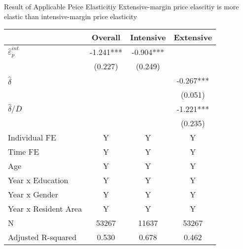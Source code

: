 \documentclass[
  ignorenonframetext,
  aspectratio=169,
]{beamer}
\begin{document}
\begin{frame}{Result of Applicable Peice Elasticitiy}
\protect\hypertarget{result-of-applicable-peice-elasticitiy}{}
Extensive-margin price elascitiy is more elastic than intensive-margin price elasticity

\begin{table}
\centering\begingroup\fontsize{8}{10}\selectfont

\begin{tabular}{lccc}
\toprule
 & Overall & Intensive & Extensive\\
\midrule
$\hat{\varepsilon}_p^{int}$ & -1.241*** & -0.904*** & \\
 & (0.227) & (0.249) & \\
$\hat{\delta}$ &  &  & -0.267***\\
 &  &  & (0.051)\\
$\hat{\delta}/\bar{D}$ &  &  & -1.221***\\
 &  &  & (0.235)\\
Individual FE & Y & Y & Y\\
Time FE & Y & Y & Y\\
Age & Y & Y & Y\\
Year x Education & Y & Y & Y\\
Year x Gender & Y & Y & Y\\
Year x Resident Area & Y & Y & Y\\
N & 53267 & 11637 & 53267\\
Adjusted R-squared & 0.530 & 0.678 & 0.462\\
\bottomrule
\end{tabular}
\endgroup{}
\end{table}
\end{frame}
\end{document}
